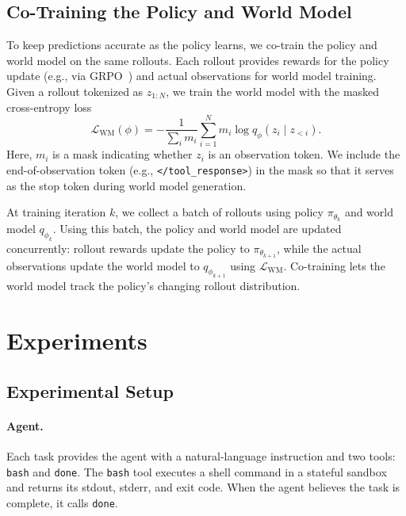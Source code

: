 \documentclass{article} %
\begin{document}
\subsection{Co-Training the Policy and World Model}
\label{sec:world-model-training}
To keep predictions accurate as the policy learns, we co-train the policy and world model on the same rollouts. Each rollout provides rewards for the policy update (e.g., via GRPO~\citep{shao2024deepseekmath, yu2026dapo}) and actual observations for world model training. Given a rollout tokenized as $z_{1:N}$, we train the world model with the masked cross-entropy loss
\begin{equation}
    \mathcal{L}_{\mathrm{WM}}(\phi)
    =
    -\frac{1}{\sum_i m_i}
    \sum_{i=1}^{N}
    m_i\log q_\phi(z_i\mid z_{<i}).
\end{equation}
Here, $m_i$ is a mask indicating whether $z_i$ is an observation token. We include the end-of-observation token (e.g., \texttt{</tool\_response>}) in the mask so that it serves as the stop token during world model generation.

At training iteration $k$, we collect a batch of rollouts using policy $\pi_{\theta_k}$ and world model $q_{\phi_k}$. Using this batch, the policy and world model are updated concurrently: rollout rewards update the policy to $\pi_{\theta_{k+1}}$, while the actual observations update the world model to $q_{\phi_{k+1}}$ using $\mathcal{L}_{\mathrm{WM}}$. Co-training lets the world model track the policy's changing rollout distribution.

\section{Experiments}

\subsection{Experimental Setup}
\label{sec:experimental-setup}

\paragraph{Agent.}
Each task provides the agent with a natural-language instruction and two tools: \texttt{bash} and \texttt{done}. The \texttt{bash} tool executes a shell command in a stateful sandbox and returns its stdout, stderr, and exit code. When the agent believes the task is complete, it calls \texttt{done}.
\end{document}
